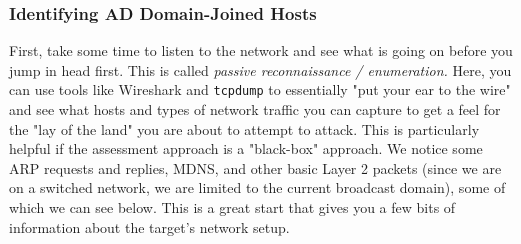 \subsubsection{Identifying AD Domain-Joined Hosts}
First, take some time to listen to the network and see what is going on before you jump in head first. This is called \textit{passive reconnaissance / enumeration.} Here, you can use tools like Wireshark and \texttt{tcpdump} to essentially "put your ear to the wire" and see what hosts and types of network traffic you can capture to get a feel for the "lay of the land" you are about to attempt to attack. This is particularly helpful if the assessment approach is a "black-box" approach. We notice some ARP requests and replies, MDNS, and other basic Layer 2 packets (since we are on a switched network, we are limited to the current broadcast domain), some of which we can see below. This is a great start that gives you a few bits of information about the target's network setup.

